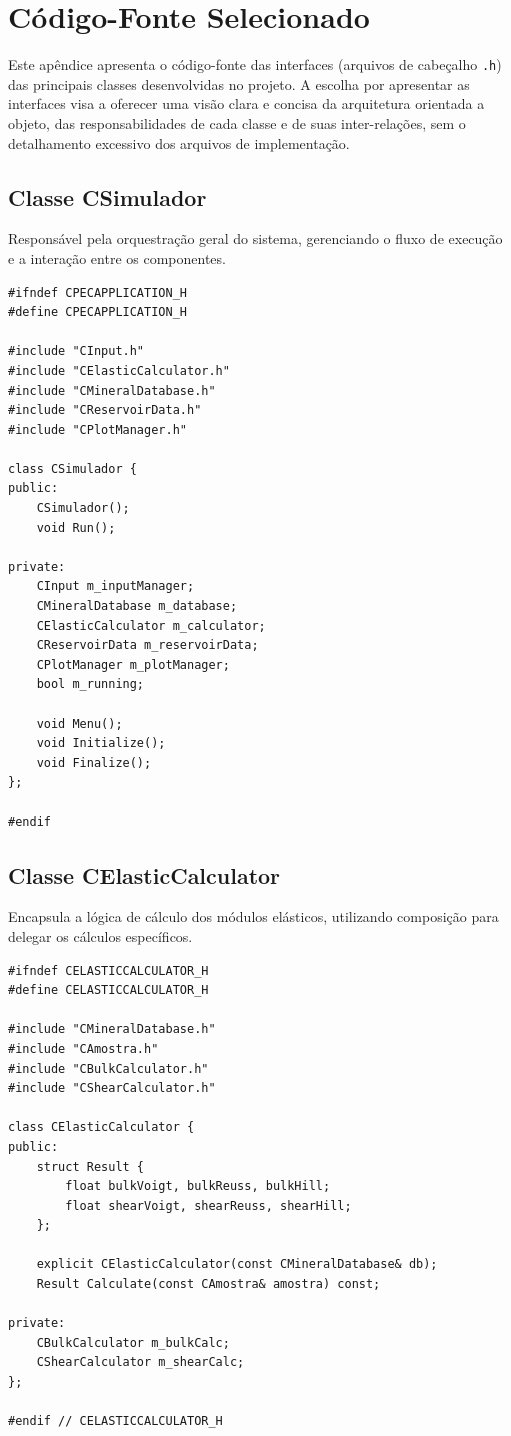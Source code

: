\chapter{Código-Fonte Selecionado}
\rhead{\thepage}

Este apêndice apresenta o código-fonte das interfaces (arquivos de cabeçalho \texttt{.h}) das principais classes desenvolvidas no projeto. A escolha por apresentar as interfaces visa a oferecer uma visão clara e concisa da arquitetura orientada a objeto, das responsabilidades de cada classe e de suas inter-relações, sem o detalhamento excessivo dos arquivos de implementação.

\section{Classe CSimulador}
Responsável pela orquestração geral do sistema, gerenciando o fluxo de execução e a interação entre os componentes.
\begin{verbatim}
#ifndef CPECAPPLICATION_H
#define CPECAPPLICATION_H

#include "CInput.h"
#include "CElasticCalculator.h"
#include "CMineralDatabase.h"
#include "CReservoirData.h"
#include "CPlotManager.h"

class CSimulador {
public:
    CSimulador();
    void Run();

private:
    CInput m_inputManager;
    CMineralDatabase m_database;
    CElasticCalculator m_calculator;
    CReservoirData m_reservoirData;
    CPlotManager m_plotManager;
    bool m_running;

    void Menu();
    void Initialize();
    void Finalize();
};

#endif
\end{verbatim}

\section{Classe CElasticCalculator}
Encapsula a lógica de cálculo dos módulos elásticos, utilizando composição para delegar os cálculos específicos.
\begin{verbatim}
#ifndef CELASTICCALCULATOR_H
#define CELASTICCALCULATOR_H

#include "CMineralDatabase.h"
#include "CAmostra.h"
#include "CBulkCalculator.h"
#include "CShearCalculator.h"

class CElasticCalculator {
public:
    struct Result {
        float bulkVoigt, bulkReuss, bulkHill;
        float shearVoigt, shearReuss, shearHill;
    };

    explicit CElasticCalculator(const CMineralDatabase& db);
    Result Calculate(const CAmostra& amostra) const;

private:
    CBulkCalculator m_bulkCalc;
    CShearCalculator m_shearCalc;
};

#endif // CELASTICCALCULATOR_H
\end{verbatim}


